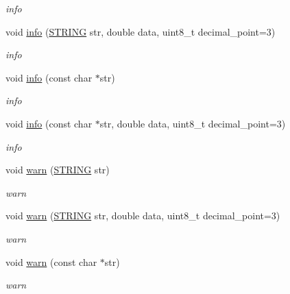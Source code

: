 \begin{DoxyCompactItemize}
\begin{DoxyCompactList}\small\item\em info \end{DoxyCompactList}\item 
void \hyperlink{namespacerobotis__manipulator_1_1log_a530c16a6f6f6d7fe007ec32836af28a8}{info} (\hyperlink{robotis__manipulator__log_8h_a67f156408fa9d656017c406fe4f4b330}{S\+T\+R\+I\+NG} str, double data, uint8\+\_\+t decimal\+\_\+point=3)
\begin{DoxyCompactList}\small\item\em info \end{DoxyCompactList}\item 
void \hyperlink{namespacerobotis__manipulator_1_1log_a505032270cb596ee01dfc8e3030dc2c7}{info} (const char $\ast$str)
\begin{DoxyCompactList}\small\item\em info \end{DoxyCompactList}\item 
void \hyperlink{namespacerobotis__manipulator_1_1log_af5acc2141dc021f203cccc3ca3120d92}{info} (const char $\ast$str, double data, uint8\+\_\+t decimal\+\_\+point=3)
\begin{DoxyCompactList}\small\item\em info \end{DoxyCompactList}\item 
void \hyperlink{namespacerobotis__manipulator_1_1log_a0b7fa98d31c1beaf1c7d0989723a5fa2}{warn} (\hyperlink{robotis__manipulator__log_8h_a67f156408fa9d656017c406fe4f4b330}{S\+T\+R\+I\+NG} str)
\begin{DoxyCompactList}\small\item\em warn \end{DoxyCompactList}\item 
void \hyperlink{namespacerobotis__manipulator_1_1log_aac4f8d437de82deb67e7e9c4688dfcdc}{warn} (\hyperlink{robotis__manipulator__log_8h_a67f156408fa9d656017c406fe4f4b330}{S\+T\+R\+I\+NG} str, double data, uint8\+\_\+t decimal\+\_\+point=3)
\begin{DoxyCompactList}\small\item\em warn \end{DoxyCompactList}\item 
void \hyperlink{namespacerobotis__manipulator_1_1log_adcfad83d39b25e03a57b8cb20283606b}{warn} (const char $\ast$str)
\begin{DoxyCompactList}\small\item\em warn \end{DoxyCompactList}\item 

\end{DoxyCompactItemize}
